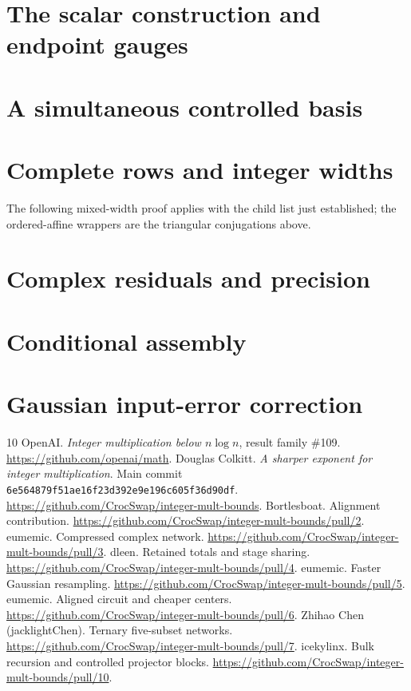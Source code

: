 \documentclass[11pt]{article}
\begin{document}
\section{The scalar construction and endpoint gauges}

\section{A simultaneous controlled basis}


\section{Complete rows and integer widths}
The following mixed-width proof applies with the child list just established;
the ordered-affine wrappers are the triangular conjugations above.

\section{Complex residuals and precision}

\section{Conditional assembly}

\section{Gaussian input-error correction}

\begin{thebibliography}{10}
 OpenAI. \emph{Integer multiplication below $n\log n$},
result family \#109. \url{https://github.com/openai/math}.
 Douglas Colkitt. \emph{A sharper exponent for integer
multiplication}. Main commit
\texttt{6e564879f51ae16f23d392e9e196c605f36d90df}.
\url{https://github.com/CrocSwap/integer-mult-bounds}.
 Bortlesboat. Alignment contribution.
\url{https://github.com/CrocSwap/integer-mult-bounds/pull/2}.
 eumemic. Compressed complex network.
\url{https://github.com/CrocSwap/integer-mult-bounds/pull/3}.
 dleen. Retained totals and stage sharing.
\url{https://github.com/CrocSwap/integer-mult-bounds/pull/4}.
 eumemic. Faster Gaussian resampling.
\url{https://github.com/CrocSwap/integer-mult-bounds/pull/5}.
 eumemic. Aligned circuit and cheaper centers.
\url{https://github.com/CrocSwap/integer-mult-bounds/pull/6}.
 Zhihao Chen (jacklightChen). Ternary five-subset networks.
\url{https://github.com/CrocSwap/integer-mult-bounds/pull/7}.
 icekylinx. Bulk recursion and controlled projector blocks.
\url{https://github.com/CrocSwap/integer-mult-bounds/pull/10}.
\end{thebibliography}
\end{document}
